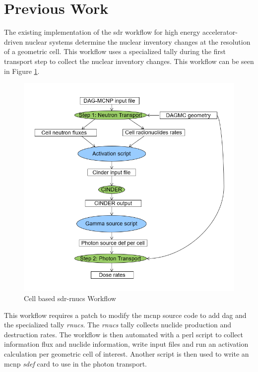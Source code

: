 \section{Previous Work}
The existing implementation of the \gls{sdr} workflow for high energy
accelerator-driven nuclear systems determine the nuclear inventory changes at
the resolution of a geometric cell. This workflow uses a specialized tally
during the first transport step to collect the nuclear inventory changes. This
workflow can be seen in Figure \ref{fig:cell_rnucs}.
\begin{figure}[H]
        \centering
        \includegraphics[scale=0.4]{../figs/rnucs_r2s.png}
        \caption{Cell based \gls{sdr}-rnucs Workflow}
        \label{fig:cell_rnucs}
\end{figure}
This workflow requires a patch to modify the \gls{mcnp} source code to add
\gls{dag} and the specialized tally \emph{rnucs}. The \emph{rnucs} tally
collects nuclide production and destruction rates. The workflow is then
automated with a perl script to collect information flux and nuclide
information, write input files and run an activation calculation per geometric
cell of interest. Another script is then used to write an \gls{mcnp}
\emph{sdef} card to use in the photon transport.
\newpage
